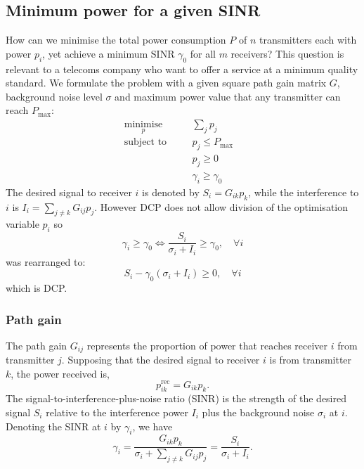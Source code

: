 \documentclass[twocolumn,secnumarabic,amssymb, nobibnotes, aps, prl,superscriptaddress]{revtex4-1}
\begin{document}
\subsection{Minimum power for a given SINR}
How can we minimise the total power consumption $P$ of $n$ transmitters each with power $p_i$, yet achieve a minimum SINR $\gamma_0$ for all $m$ receivers? This question is relevant to a telecoms company who want to offer a service at a minimum quality standard. We formulate the problem with a given square path gain matrix $G$, background noise level $\sigma$ and maximum power value that any transmitter can reach $P_{\text{max}}$:
		\begin{align*}
				&\underset{p}{\text{minimise}} \quad &&\sum_j p_j\\
				&\text{subject to} \quad &&p_j \leq P_{\max}\\
				& \quad &&p_j \geq 0\\
				& \quad &&\gamma_i \geq \gamma_0&&
		\end{align*}
The desired signal to receiver $i$ is denoted by $S_i = G_{ik}p_k$, while the interference to $i$ is $I_i = \sum_{j\neq k}G_{ij}p_j$. However DCP does not allow division of the optimisation variable $p_i$ so  
\begin{equation*}
  \gamma_i \geq \gamma_0\Longleftrightarrow  \frac{S_i}{\sigma_i + I_i}\geq \gamma_0, \quad \forall i
\end{equation*}
was rearranged to:
\begin{equation*}
S_i-\gamma_0(\sigma_i + I_i)\geq 0, \quad \forall i
\end{equation*} which is DCP.
\subsubsection{Path gain}
The path gain $G_{ij}$ represents the proportion of power that reaches receiver $i$ from transmitter $j$. Supposing that the desired signal to receiver $i$ is from transmitter $k$, the power received is,
\begin{equation}
p_{ik}^{\text{rec}} = G_{ik}p_k.
\end{equation}
The signal-to-interference-plus-noise ratio (SINR) is the strength of the desired signal $S_i$ relative to the interference power $I_i$ plus the background noise $\sigma_i$ at $i$. Denoting the SINR at $i$ by $\gamma_i$, we have
\begin{equation}
\gamma_i = \frac{G_{ik}p_k}{\sigma_i+\sum_{j\neq k}G_{ij}p_j}
=\frac{S_i}{\sigma_i+I_i}.
\end{equation}
\end{document}
